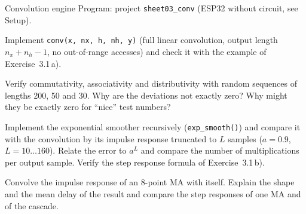 \begin{exercise}{Convolution engine}{\Wokwi}
Program: project \texttt{sheet03\_conv} (ESP32 without circuit, see Setup).
\begin{tasks}
  \item Implement \texttt{conv(x, nx, h, nh, y)} (full linear convolution, output
    length $n_x+n_h-1$, no out-of-range accesses) and check it with the example of
    Exercise~3.1\,a).
  \item Verify commutativity, associativity and distributivity with random
    sequences of lengths 200, 50 and 30. Why are the deviations not exactly zero?
    Why might they be exactly zero for ``nice'' test numbers?
  \item Implement the exponential smoother recursively (\texttt{exp\_smooth()}) and
    compare it with the convolution by its impulse response truncated to $L$
    samples ($a=0.9$, $L=10\dots160$). Relate the error to $a^L$ and compare the
    number of multiplications per output sample. Verify the step response
    formula of Exercise~3.1\,b).
  \item Convolve the impulse response of an 8-point MA with itself. Explain the
    shape and the mean delay of the result and compare the step responses of one
    MA and of the cascade.
\end{tasks}
\end{exercise}


